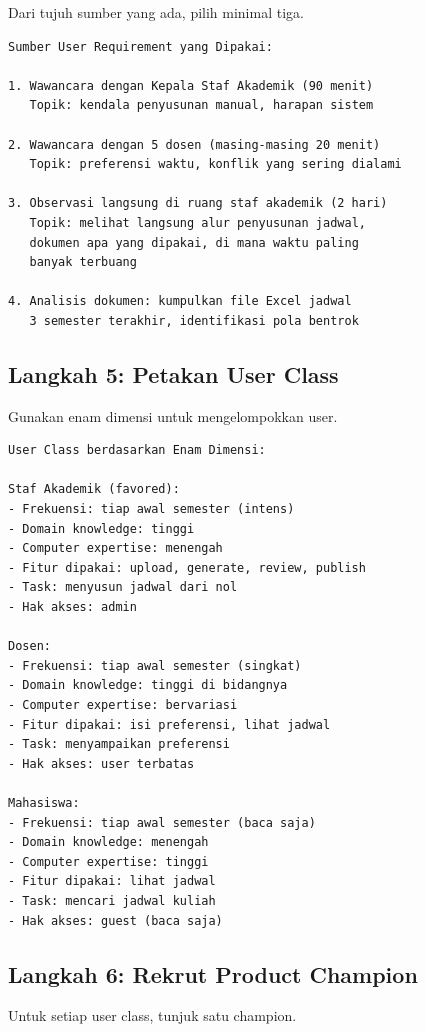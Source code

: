 \documentclass[11pt,a4paper]{article}
\begin{document}
Dari tujuh sumber yang ada, pilih minimal tiga.

\begin{lstlisting}[style=out]
Sumber User Requirement yang Dipakai:

1. Wawancara dengan Kepala Staf Akademik (90 menit)
   Topik: kendala penyusunan manual, harapan sistem

2. Wawancara dengan 5 dosen (masing-masing 20 menit)
   Topik: preferensi waktu, konflik yang sering dialami

3. Observasi langsung di ruang staf akademik (2 hari)
   Topik: melihat langsung alur penyusunan jadwal,
   dokumen apa yang dipakai, di mana waktu paling
   banyak terbuang

4. Analisis dokumen: kumpulkan file Excel jadwal
   3 semester terakhir, identifikasi pola bentrok
\end{lstlisting}

\subsection{Langkah 5: Petakan User Class}

Gunakan enam dimensi untuk mengelompokkan user.

\begin{lstlisting}[style=out]
User Class berdasarkan Enam Dimensi:

Staf Akademik (favored):
- Frekuensi: tiap awal semester (intens)
- Domain knowledge: tinggi
- Computer expertise: menengah
- Fitur dipakai: upload, generate, review, publish
- Task: menyusun jadwal dari nol
- Hak akses: admin

Dosen:
- Frekuensi: tiap awal semester (singkat)
- Domain knowledge: tinggi di bidangnya
- Computer expertise: bervariasi
- Fitur dipakai: isi preferensi, lihat jadwal
- Task: menyampaikan preferensi
- Hak akses: user terbatas

Mahasiswa:
- Frekuensi: tiap awal semester (baca saja)
- Domain knowledge: menengah
- Computer expertise: tinggi
- Fitur dipakai: lihat jadwal
- Task: mencari jadwal kuliah
- Hak akses: guest (baca saja)
\end{lstlisting}

\subsection{Langkah 6: Rekrut Product Champion}

Untuk setiap user class, tunjuk satu champion.
\end{document}
